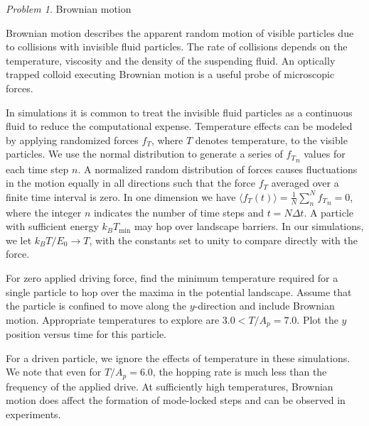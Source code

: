 \documentclass[preprint,showpacs,preprintnumbers,amsmath,amssymb,aps,prb]{revtex4-1}
\theoremstyle{remark}
\newtheorem{problem}{Problem}
\begin{document}

 \begin{problem}{Brownian motion}
  \label{ex:brownian}
  
\noindent Brownian motion describes the apparent random motion     of 
  visible particles  
  due to collisions with invisible fluid particles.
  The rate of collisions depends on the temperature, viscosity
  and the density of 
  the suspending fluid.\cite{Einstein1905}
  An optically trapped colloid executing Brownian motion
  is a useful probe of microscopic forces.\cite{Volpe2013}
  
  In   simulations
  it is common to treat the 
  invisible fluid particles as a continuous fluid
  to reduce the computational expense.
  Temperature effects
  can be modeled by applying randomized forces $f_T$,
  where $T$ denotes temperature, 
  to the visible particles.
  We use the normal distribution 
  to generate a series of ${f_T}_n$ values for
  each  time step $n$.\cite{numpy}
  A normalized random distribution of forces
  causes fluctuations in the
  motion 
  equally in all
  directions such that the force $f_T$
  averaged over a finite time interval
  is zero.  In one dimension we have 
$
    \langle f_T(t) \rangle = \frac{1}{N} \sum_n^N {f_T}_n = 0$,
  where the integer $n$ indicates the number of  
    time steps and 
  $t = N \Delta t$.
  A particle
  with sufficient energy $k_B T_{\min}$ may 
  hop over landscape
  barriers.
  In our simulations,
  we let   
  $k_B T/E_0 \rightarrow T$,
  with the constants set to unity
  to
  compare directly with the force. 
 
  For zero applied driving force,
  find 
  the minimum temperature required for a single particle
  to hop over the maxima in the potential landscape.
  Assume that the particle is confined to
  move along the $y$-direction and
  include Brownian motion.
  Appropriate temperatures to explore
  are $3.0 < T/A_p = 7.0$.
Plot the $y$ position versus time
  for this particle.
 

  For a driven particle,
  we ignore 
  the effects of temperature 
  in these simulations.  
  We note that even for $T/A_p = 6.0$, 
  the hopping rate
  is much less than the
  frequency of the applied drive.   
  At sufficiently high temperatures,
  Brownian motion does affect 
  the formation of mode-locked steps
  and can be observed in experiments.
\end{problem}
\end{document}
